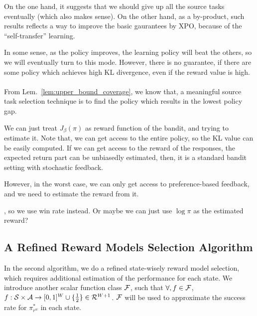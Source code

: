 On the one hand, it suggests that we should give up all the source tasks eventually (which also makes sense).
On the other hand, as a by-product, such results reflects a way to improve the basic gaurantees by XPO, because of the ``self-transfer'' learning.


In some sense, as the policy improves, the learning policy will beat the others, so we will eventually turn to this mode. However, there is no guarantee, if there are some policy which achieves high KL divergence, even if the reward value is high.


\paragraph{}
From Lem.~\ref{lem:upper_bound_coverage}, we know that, a meaningful source task selection technique is to find the policy which results in the lowest policy gap.

We can just treat $J_\beta(\pi)$ as reward function of the bandit, and trying to estimate it.
Note that, we can get access to the entire policy, so the KL value can be easily computed.
If we can get access to the reward of the responses, the expected return part can be unbiasedly estimated, then, it is a standard bandit setting with stochastic feedback.

However, in the worst case, we can only get access to preference-based feedback, and we need to estimate the reward from it.

%
%
%
%
%
%
%
%

%
%


, so we use win rate instead. Or maybe we can just use $\log \pi$ as the estimated reward?
\fi

\iffalse
\newpage
\subsection{A Refined Reward Models Selection Algorithm}
In the second algorithm, we do a refined state-wisely reward model selection, which requires additional estimation of the performance for each state.
We introduce another scalar function class $\mathcal{F}$, such that $\forall, f\in\mathcal{F}$, $f:\mathcal{S}\times\mathcal{A} \rightarrow [0,1]^W \cup \{\frac{1}{2}\} \in \mathcal{R}^{W+1}$. $\mathcal{F}$ will be used to approximate the success rate for $\pi^*_{r^w}$ in each state.

